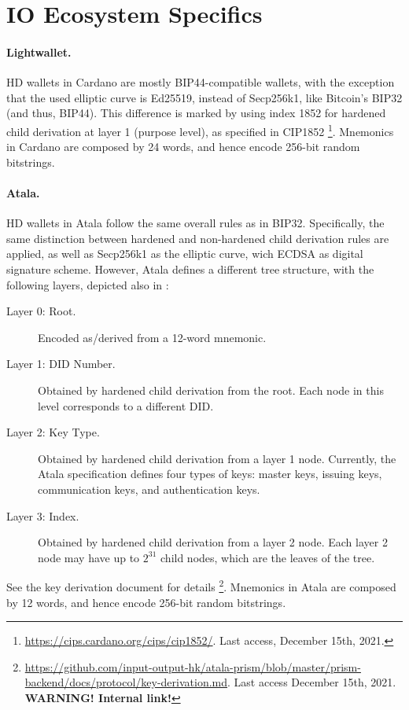 \section{IO Ecosystem Specifics}
\label{sec:io}

\paragraph{Lightwallet.} HD wallets in Cardano are mostly BIP44-compatible
wallets, with the exception that the used elliptic curve is Ed25519,
instead of Secp256k1, like Bitcoin's BIP32 (and thus, BIP44). This
difference is marked by using index 1852 for hardened child derivation at
layer 1 (purpose level), as specified in CIP1852%
\footnote{\url{https://cips.cardano.org/cips/cip1852/}. Last access, December
  15th, 2021.}. Mnemonics in Cardano are composed by 24 words, and hence
encode 256-bit random bitstrings.

\paragraph{Atala.} HD wallets in Atala follow the same overall rules as in
BIP32. Specifically, the same distinction between hardened and non-hardened
child derivation rules are applied, as well as Secp256k1 as the elliptic curve,
wich ECDSA as digital signature scheme. However, Atala defines a different
tree structure, with the following layers, depicted also in :

\begin{description}
\item[Layer 0: Root.] Encoded as/derived from a 12-word mnemonic.
\item[Layer 1: DID Number.] Obtained by hardened child derivation from the root.
  Each node in this level corresponds to a different DID.
\item[Layer 2: Key Type.]  Obtained by hardened child derivation from a layer 1
  node. Currently, the Atala specification defines four types of keys: master
  keys, issuing keys, communication keys, and authentication keys.
\item[Layer 3: Index.] Obtained by hardened child derivation from a layer 2 node.
  Each layer 2 node may have up to $2^{31}$ child nodes, which are the leaves of
  the tree.
\end{description}

See the key derivation document for details%
\footnote{\url{https://github.com/input-output-hk/atala-prism/blob/master/prism-backend/docs/protocol/key-derivation.md}. Last access December 15th, 2021. \textbf{WARNING!
    Internal link!}}. Mnemonics in Atala are composed by 12 words, and hence
encode 256-bit random bitstrings.

